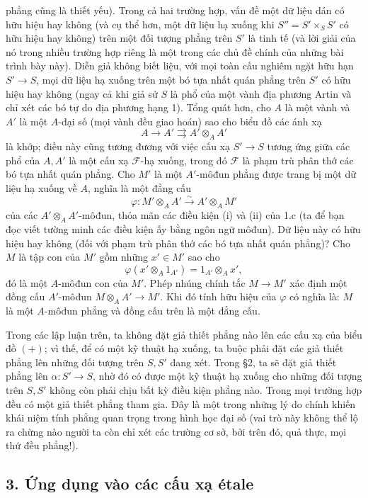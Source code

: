 phẳng cũng là thiết yếu). Trong cả hai trường hợp, vấn đề một dữ liệu dán có
hữu hiệu hay không (và cụ thể hơn, một dữ liệu hạ xuống khi
$S''=S'\times_SS'$ có hữu hiệu hay không) trên một đối tượng phẳng trên $S'$
là tinh tế (và lời giải của nó trong nhiều trường hợp riêng là một trong các
chủ đề chính của những bài trình bày này). Diễn giả không biết liệu, với mọi
toàn cấu nghiêm ngặt hữu hạn $S'\longrightarrow S$, mọi dữ liệu hạ xuống trên
một bó tựa nhất quán phẳng trên $S'$ có hữu hiệu hay không (ngay cả khi giả sử
$S$ là phổ của một vành địa phương Artin và chỉ xét các bó tự do địa phương
hạng 1). Tổng quát hơn, cho $A$ là một vành và $A'$ là một $A$-đại số (mọi
vành đều giao hoán) sao cho biểu đồ các ánh xạ
\[
  A\longrightarrow A'\rightrightarrows A'\otimes_AA'
\]
là khớp; điều này cũng tương đương với việc cấu xạ $S'\longrightarrow S$ tương
ứng giữa các phổ của $A,A'$ là một cấu xạ $\mathcal F$-hạ xuống, trong đó
$\mathcal F$ là phạm trù phân thớ các bó tựa nhất quán phẳng. Cho $M'$ là một
$A'$-môđun phẳng được trang bị một dữ liệu hạ xuống về $A$, nghĩa là một đẳng
cấu
\[
  \varphi:M'\otimes_AA'\xrightarrow{\sim}A'\otimes_AM'
\]
của các $A'\otimes_AA'$-môđun, thỏa mãn các điều kiện (i) và (ii) của 1.c (ta
để bạn đọc viết tường minh các điều kiện ấy bằng ngôn ngữ môđun). Dữ liệu này
có hữu hiệu hay không (đối với phạm trù phân thớ các bó tựa nhất quán phẳng)?
Cho $M$ là tập con của $M'$ gồm những $x'\in M'$ sao cho
\[
  \varphi(x'\otimes_A1_{A'})=1_{A'}\otimes_Ax',
\]
đó là một $A$-môđun con của $M'$. Phép nhúng chính tắc
$M\longrightarrow M'$ xác định một đồng cấu $A'$-môđun
$M\otimes_AA'\longrightarrow M'$. Khi đó tính hữu hiệu của $\varphi$ có nghĩa
là: $M$ là một $A$-môđun phẳng và đồng cấu trên là một đẳng cấu.

 Trong các lập luận trên, ta không đặt giả thiết phẳng nào
lên các cấu xạ của biểu đồ $(+)$; vì thế, để có một kỹ thuật hạ xuống, ta buộc
phải đặt các giả thiết phẳng lên những đối tượng trên $S,S'$ đang xét. Trong
§2, ta sẽ đặt giả thiết phẳng lên $\alpha:S'\longrightarrow S$, nhờ đó có được
một kỹ thuật hạ xuống cho những đối tượng trên $S,S'$ không còn phải chịu bất
kỳ điều kiện phẳng nào. Trong mọi trường hợp đều có một giả thiết phẳng tham
gia. Đây là một trong những lý do chính khiến khái niệm tính phẳng quan trọng
trong hình học đại số (vai trò này không thể lộ ra chừng nào người ta còn chỉ
xét các trường cơ sở, bởi trên đó, quả thực, mọi thứ đều phẳng!).

\subsection*{3. Ứng dụng vào các cấu xạ étale}

